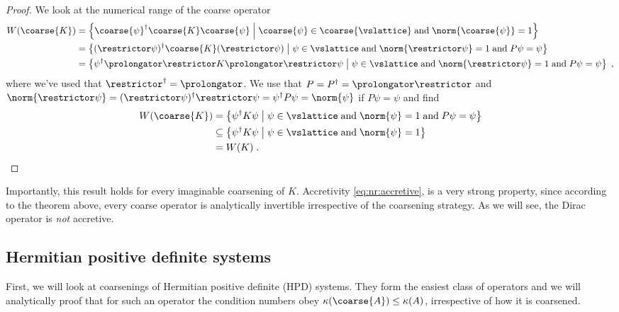 \begin{proof}
We look at the numerical range of the coarse operator
\begin{align*}
W({\coarse{K}})
&= \left\{ \coarse{\psi}^\dagger \coarse{K} \coarse{\psi} \; \middle| \; \coarse{\psi} \in \coarse{\vslattice} \; \text{and} \; \norm{\coarse{\psi}} = 1 \right\} \\
&= \left\{ (\restrictor \psi)^\dagger \coarse{K} (\restrictor \psi) \; \middle| \; \psi \in \vslattice \; \text{and} \; \norm{\restrictor \psi} = 1 \; \text{and} \; P \psi = \psi \right\} \\
&= \left\{ \psi^\dagger \prolongator \restrictor K \prolongator \restrictor \psi \; \middle| \; \psi \in \vslattice \; \text{and} \; \norm{\restrictor \psi} = 1 \; \text{and} \; P \psi = \psi \right\} \;,
\end{align*}
where we've used that $\restrictor^\dagger = \prolongator$. We use that $P = P^\dagger = \prolongator \restrictor$ and $\norm{\restrictor \psi} = (\restrictor \psi)^\dagger \restrictor \psi = \psi^\dagger P \psi = \norm{\psi}$ if $P \psi = \psi$ and find
\begin{align*}
W({\coarse{K}})
&= \left\{ \psi^\dagger K \psi \; \middle| \; \psi \in \vslattice \; \text{and} \; \norm{\psi} = 1 \; \text{and} \; P \psi = \psi \right\} \\
&\subseteq \left\{ \psi^\dagger K \psi \; \middle| \; \psi \in \vslattice \; \text{and} \; \norm{\psi} = 1 \right\} \\
&= W({K}) \;.
\end{align*}
\end{proof}

Importantly, this result holds for every imaginable coarsening of $K$.
Accretivity \cref{eq:nr:accretive}, is a very strong property, since according to the theorem above, every coarse operator is analytically invertible irrespective of the coarsening strategy.
As we will see, the Dirac operator is \emph{not} accretive.

\subsection{Hermitian positive definite systems}

First, we will look at coarsenings of Hermitian positive definite (HPD) systems.
They form the easiest class of operators and we will analytically proof that for such an operator the condition numbers obey $\kappa(\coarse{A}) \leq \kappa(A)$, irrespective of how it is coarsened.

